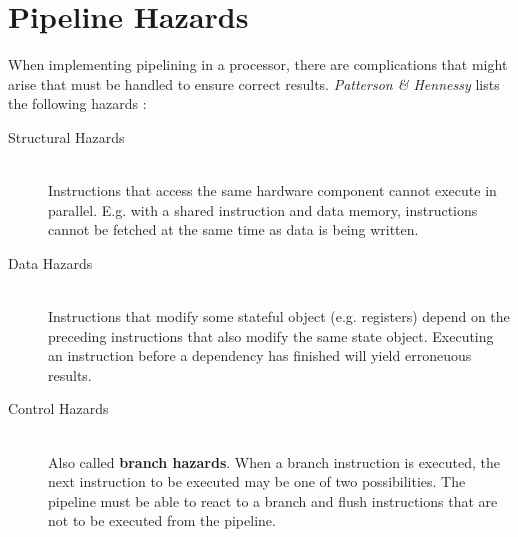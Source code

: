 \section{Pipeline Hazards}
When implementing pipelining in a processor,
there are complications that might arise that must be handled to ensure correct results.
\textit{Patterson \& Hennessy} lists the following hazards
\cite[Chapter 4.5]{bib:patt-henn}:

\begin{description}
\item[Structural Hazards] \hfill \\
    Instructions that access the same hardware component cannot execute in parallel.
    E.g. with a shared instruction and data memory,
    instructions cannot be fetched at the same time as data is being written.
\item[Data Hazards] \hfill \\
    Instructions that modify some stateful object (e.g. registers) depend on the preceding instructions that also modify the same state object.
    Executing an instruction before a dependency has finished will yield erroneuous results.
\item[Control Hazards] \hfill \\
    Also called \textbf{branch hazards}.
    When a branch instruction is executed,
    the next instruction to be executed may be one of two possibilities.
    The pipeline must be able to react to a branch and flush instructions that are not to be executed from the pipeline.
\end{description}
